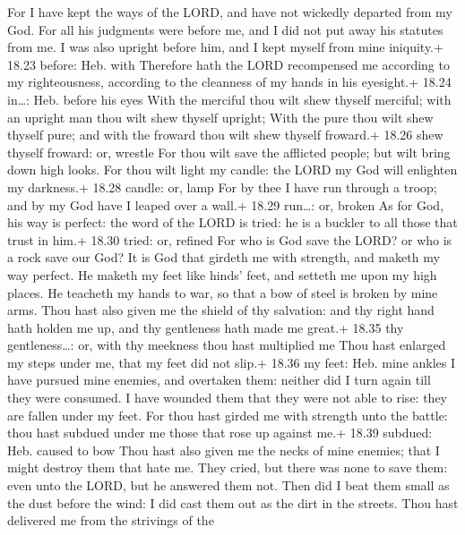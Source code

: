  For I have kept the ways of the LORD, and have not
wickedly departed from my God.  For all his judgments were
before me, and I did not put away his statutes from me.  I
was also upright before him, and I kept myself from mine iniquity.+
18.23 before: Heb. with  Therefore hath the LORD
recompensed me according to my righteousness, according to the cleanness
of my hands in his eyesight.+ 18.24 in\ldots: Heb. before his eyes
 With the merciful thou wilt shew thyself merciful; with an
upright man thou wilt shew thyself upright;  With the pure
thou wilt shew thyself pure; and with the froward thou wilt shew thyself
froward.+ 18.26 shew thyself froward: or, wrestle  For thou
wilt save the afflicted people; but wilt bring down high looks.
 For thou wilt light my candle: the LORD my God will
enlighten my darkness.+ 18.28 candle: or, lamp  For by thee
I have run through a troop; and by my God have I leaped over a wall.+
18.29 run\ldots: or, broken  As for God, his way is
perfect: the word of the LORD is tried: he is a buckler to all those
that trust in him.+ 18.30 tried: or, refined  For who is
God save the LORD? or who is a rock save our God?  It is
God that girdeth me with strength, and maketh my way perfect.
 He maketh my feet like hinds' feet, and setteth me upon my
high places.  He teacheth my hands to war, so that a bow of
steel is broken by mine arms.  Thou hast also given me the
shield of thy salvation: and thy right hand hath holden me up, and thy
gentleness hath made me great.+ 18.35 thy gentleness\ldots: or, with thy
meekness thou hast multiplied me  Thou hast enlarged my
steps under me, that my feet did not slip.+ 18.36 my feet: Heb. mine
ankles  I have pursued mine enemies, and overtaken them:
neither did I turn again till they were consumed.  I have
wounded them that they were not able to rise: they are fallen under my
feet.  For thou hast girded me with strength unto the
battle: thou hast subdued under me those that rose up against me.+ 18.39
subdued: Heb. caused to bow  Thou hast also given me the
necks of mine enemies; that I might destroy them that hate me.
 They cried, but there was none to save them: even unto the
LORD, but he answered them not.  Then did I beat them small
as the dust before the wind: I did cast them out as the dirt in the
streets.  Thou hast delivered me from the strivings of the
